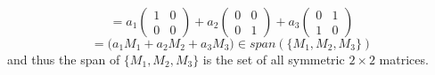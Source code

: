 \documentclass{article}
\begin{document}
\begin{equation*}
    = a_{1}\begin{pmatrix} 1 & 0\\ 0 & 0 \end{pmatrix} + a_{2}\begin{pmatrix} 0 & 0\\ 0 & 1 \end{pmatrix} + a_{3}\begin{pmatrix} 0 & 1\\ 1 & 0 \end{pmatrix}
\end{equation*}
\begin{equation*}
    = \Big(a_{1}M_{1} + a_{2}M_{2} + a_{3}M_{3}\Big) \in span(\{M_{1}, M_{2}, M_{3}\})
\end{equation*}
and thus the span of \(\{M_{1}, M_{2}, M_{3}\}\) is the set of all symmetric \(2 \times 2\) matrices.
\end{document}
